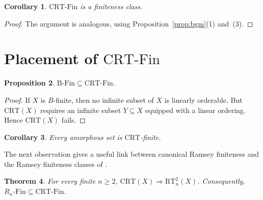 \documentclass[10pt,a4paper]{amsart}
\newtheorem{theorem}{Theorem}[section]
\newtheorem{proposition}[theorem]{Proposition}
\newtheorem{corollary}[theorem]{Corollary}
\theoremstyle{definition}
\newcommand{\BFin}{\mathrm{B\text{-}Fin}}
\newcommand{\RnFin}[1]{R_{#1}\text{-}\mathrm{Fin}}
\newcommand{\CRT}{\mathrm{CRT}}
\newcommand{\RT}{\mathrm{RT}}
\newcommand{\CRTFin}{\CRT\text{-}\mathrm{Fin}}
\begin{document}
\begin{corollary}\label{cor:crt-fin-class}
\(\CRTFin\) is a finiteness class.
\end{corollary}

\begin{proof}
The argument is analogous, using Proposition~\ref{prop:bgm}(1) and~(3).
\end{proof}

\section{Placement of \(\CRTFin\)}

\begin{proposition}\label{prop:bfin-crt}
\(\BFin\subseteq \CRTFin\).
\end{proposition}

\begin{proof}
If \(X\) is \(B\)-finite, then no infinite subset of \(X\) is linearly orderable.  But \(\CRT(X)\) requires an infinite subset \(Y\subseteq X\) equipped with a linear ordering.  Hence \(\CRT(X)\) fails.
\end{proof}

\begin{corollary}
Every amorphous set is \(\CRT\)-finite.
\end{corollary}

The next observation gives a useful link between canonical Ramsey finiteness and the Ramsey finiteness classes of \cite{BCF}.

\begin{theorem}\label{thm:crt-implies-rt}
For every finite \(n\geq 2\), \(\CRT(X)\Rightarrow \RT^2_n(X)\).  Consequently, \(\RnFin{n}\subseteq \CRTFin\).
\end{theorem}
\end{document}
